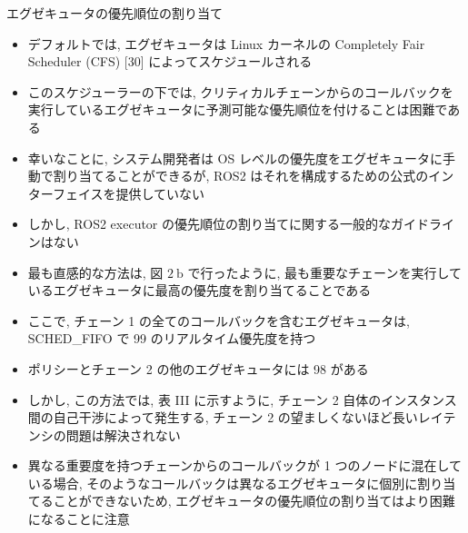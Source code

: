 \begin{frame}{エグゼキュータの優先順位の割り当て}
    \begin{itemize}
        \item デフォルトでは, エグゼキュータは Linux カーネルの Completely Fair Scheduler (CFS) [30] によってスケジュールされる
\item このスケジューラーの下では, クリティカルチェーンからのコールバックを実行しているエグゼキュータに予測可能な優先順位を付けることは困難である
\item 幸いなことに, システム開発者は OS レベルの優先度をエグゼキュータに手動で割り当てることができるが, ROS2 はそれを構成するための公式のインターフェイスを提供していない
\item しかし, ROS2 executor の優先順位の割り当てに関する一般的なガイドラインはない
\item 最も直感的な方法は, 図 $2 \mathrm{~b}$ で行ったように, 最も重要なチェーンを実行しているエグゼキュータに最高の優先度を割り当てることである
\item ここで, チェーン 1 の全てのコールバックを含むエグゼキュータは, SCHED\_FIFO で 99 のリアルタイム優先度を持つ
\item ポリシーとチェーン 2 の他のエグゼキュータには 98 がある
\item しかし, この方法では, 表 III に示すように, チェーン 2 自体のインスタンス間の自己干渉によって発生する, チェーン 2 の望ましくないほど長いレイテンシの問題は解決されない
    \end{itemize}
\end{frame}

\begin{frame}{}
    \begin{itemize}
        \item 異なる重要度を持つチェーンからのコールバックが 1 つのノードに混在している場合, そのようなコールバックは異なるエグゼキュータに個別に割り当てることができないため, エグゼキュータの優先順位の割り当てはより困難になることに注意
    \end{itemize}
\end{frame}
